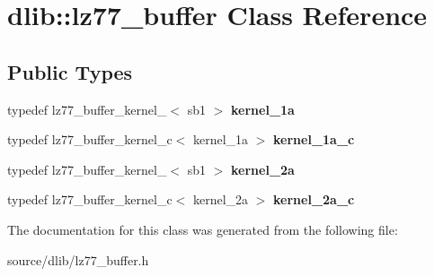 \hypertarget{classdlib_1_1lz77__buffer}{
\section{dlib::lz77\_\-buffer Class Reference}
\label{classdlib_1_1lz77__buffer}
}
\subsection*{Public Types}
\begin{DoxyCompactItemize}
\item 
\hypertarget{classdlib_1_1lz77__buffer_a94e824c632d26b8718c1ef66e068bdbd}{
typedef lz77\_\-buffer\_\-kernel\_$<$ sb1 $>$ {\bfseries kernel\_\-1a}}
\label{classdlib_1_1lz77__buffer_a94e824c632d26b8718c1ef66e068bdbd}

\item 
\hypertarget{classdlib_1_1lz77__buffer_a7408f05b96e717d6d76e56188d96dbfa}{
typedef lz77\_\-buffer\_\-kernel\_\-c$<$ kernel\_\-1a $>$ {\bfseries kernel\_\-1a\_\-c}}
\label{classdlib_1_1lz77__buffer_a7408f05b96e717d6d76e56188d96dbfa}

\item 
\hypertarget{classdlib_1_1lz77__buffer_a18b691dec9033825ac02f54d339f78fc}{
typedef lz77\_\-buffer\_\-kernel\_$<$ sb1 $>$ {\bfseries kernel\_\-2a}}
\label{classdlib_1_1lz77__buffer_a18b691dec9033825ac02f54d339f78fc}

\item 
\hypertarget{classdlib_1_1lz77__buffer_a685ead13dfdc17c201fbf8d4e4fb1fbf}{
typedef lz77\_\-buffer\_\-kernel\_\-c$<$ kernel\_\-2a $>$ {\bfseries kernel\_\-2a\_\-c}}
\label{classdlib_1_1lz77__buffer_a685ead13dfdc17c201fbf8d4e4fb1fbf}

\end{DoxyCompactItemize}


The documentation for this class was generated from the following file:\begin{DoxyCompactItemize}
\item 
source/dlib/lz77\_\-buffer.h\end{DoxyCompactItemize}
